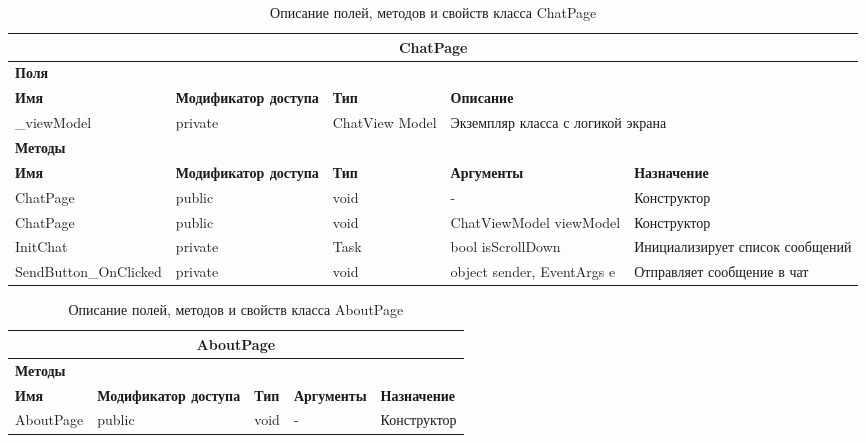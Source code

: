 \documentclass{../includes/TechDoc}
\begin{document}
    \begin{table}[ht]
        \caption{\label{tab:class-chatpage-table}Описание полей, методов и свойств класса ChatPage}
        \centering
        \begin{tabular}{|l|p{3cm}|p{2cm}|p{3cm}|p{3cm}|}
            \hline
            \multicolumn{5}{|c|}{ChatPage} \\ \hline
            \multicolumn{5}{|l|}{\textbf{Поля}} \\ \hline
            \textbf{Имя} & \textbf{Модификатор доступа} & \textbf{Тип} & \multicolumn{2}{l|}{\textbf{Описание}} \\ \hline
            \_viewModel & private & ChatView Model & \multicolumn{2}{l|}{Экземпляр класса с логикой экрана} \\ \hline
            \multicolumn{5}{|l|}{\textbf{Методы}} \\ \hline
            \textbf{Имя} & \textbf{Модификатор доступа} & \textbf{Тип} & \textbf{Аргументы} & \textbf{Назначение} \\ \hline
            ChatPage & public & void & - & Конструктор \\ \hline
            ChatPage & public & void & ChatViewModel viewModel & Конструктор \\ \hline
            InitChat & private & Task & bool isScrollDown & Инициализирует список сообщений \\ \hline
            SendButton\_OnClicked & private & void & object sender, EventArgs e & Отправляет сообщение в чат \\ \hline
        \end{tabular}
    \end{table}

    \newpage

    \begin{table}[ht]
        \caption{\label{tab:class-aboutpage-table}Описание полей, методов и свойств класса AboutPage}
        \centering
        \begin{tabular}{|l|l|l|l|l|}
            \hline
            \multicolumn{5}{|c|}{AboutPage} \\ \hline
            \multicolumn{5}{|l|}{\textbf{Методы}} \\ \hline
            \textbf{Имя} & \textbf{Модификатор доступа} & \textbf{Тип} & \textbf{Аргументы} & \textbf{Назначение} \\ \hline
            AboutPage & public & void & - & Конструктор \\ \hline
        \end{tabular}
    \end{table}
\end{document}
